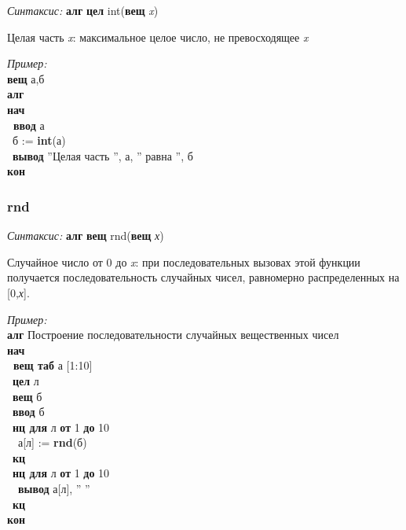 \documentclass[12pt,a4paper]{article}
\newcommand{\otstup}{\textperiodcentered\ }
\begin{document}
\emph{Синтаксис:} \textbf{алг} \textbf{цел} int(\textbf{вещ} \emph{x})


     
 
		 Целая часть \emph{x}: максимальное целое число, не превосходящее \emph{x}
      
\emph{Пример:}  
\sffamily
~\\\textbf{вещ} а,б
~\\\textbf{алг
~\\нач
~\\\otstup ввод} а
~\\\otstup б := \textbf{int}(а)
~\\\otstup \textbf{вывод} ''Целая часть '', а, '' равна '', б
~\\\textbf{кон }









 
\normalfont
\subsubsection{rnd}

\emph{Синтаксис:} \textbf{алг} \textbf{вещ} rnd(\textbf{вещ} \emph{х})


     
 
	Случайное число от 0 до \emph{x}: при последовательных вызовах этой функции получается 
последовательность  случайных чисел, равномерно распределенных на [0,\emph{х}].
      
\emph{Пример:}  
\sffamily
~\\\textbf{алг} Построение последовательности случайных вещественных чисел
~\\\textbf{нач
~\\\otstup вещ таб} а [1:10]
~\\\otstup \textbf{цел} л
~\\\otstup \textbf{вещ} б
~\\\otstup \textbf{ввод} б
~\\\otstup \textbf{нц для} л \textbf{от} 1 \textbf{до} 10 
~\\\otstup \otstup а[л] := \textbf{rnd}(б)
~\\\otstup \textbf{кц}
~\\\otstup \textbf{нц для} л \textbf{от} 1 \textbf{до} 10 
~\\\otstup \otstup \textbf{вывод} а[л], '' ''
~\\\otstup \textbf{кц
~\\кон}
\end{document}
